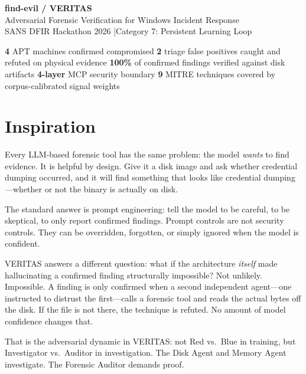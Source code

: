 \documentclass[10pt, letterpaper]{article}
\begin{document}
\begin{center}
  {\LARGE\bfseries\color{accent} find-evil / VERITAS}\\[3pt]
  {\large Adversarial Forensic Verification for Windows Incident Response}\\[2pt]
  {\small SANS DFIR Hackathon 2026 \quad|\quad Category 7: Persistent Learning Loop}
\end{center}

\begin{statbox}
\small\centering
\textbf{4} APT machines confirmed compromised\quad
\textbf{2} triage false positives caught and refuted on physical evidence\quad
\textbf{100\%} of confirmed findings verified against disk artifacts\quad
\textbf{4-layer} MCP security boundary\quad
\textbf{9} MITRE techniques covered by corpus-calibrated signal weights
\end{statbox}

\section{Inspiration}

Every LLM-based forensic tool has the same problem: the model
\emph{wants} to find evidence. It is helpful by design. Give it a
disk image and ask whether credential dumping occurred, and it will
find something that looks like credential dumping---whether or not the
binary is actually on disk.

The standard answer is prompt engineering: tell the model to be
careful, to be skeptical, to only report confirmed findings. Prompt
controls are not security controls. They can be overridden, forgotten,
or simply ignored when the model is confident.

VERITAS answers a different question: what if the architecture
\emph{itself} made hallucinating a confirmed finding structurally
impossible? Not unlikely. Impossible. A finding is only confirmed when a
second independent agent---one instructed to distrust the first---calls
a forensic tool and reads the actual bytes off the disk. If the file is
not there, the technique is refuted. No amount of model confidence
changes that.

That is the adversarial dynamic in VERITAS: not Red vs.\ Blue in
training, but Investigator vs.\ Auditor in investigation. The Disk Agent
and Memory Agent investigate. The Forensic Auditor demands proof.
\end{document}
